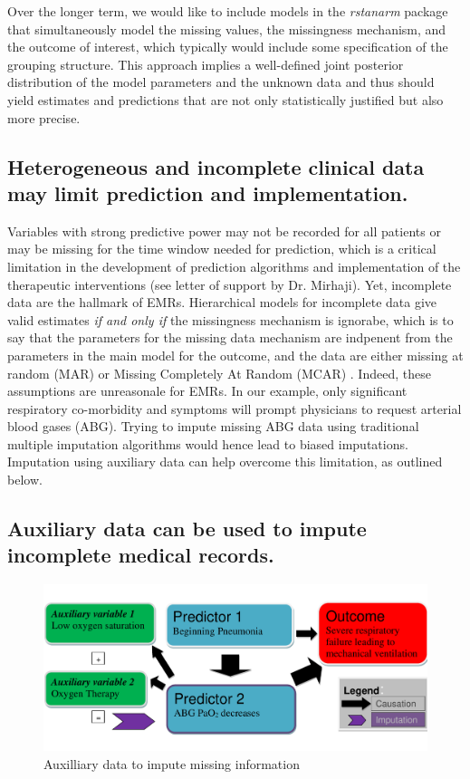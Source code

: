 \documentclass[11pt,notitlepage]{article}
\begin{document}
Over the longer term, we would like to include models in the \textit{rstanarm} package that
simultaneously model the missing values, the missingness mechanism, and the outcome of 
interest, which typically would include some specification of the grouping structure. This
approach implies a well-defined joint posterior distribution of the model parameters and 
the unknown data and thus should yield estimates and predictions that are not only statistically
justified but also more precise.

\subsection*{Heterogeneous and incomplete clinical data may limit prediction and implementation.}
Variables with strong predictive power may not be recorded for all patients 
or may be missing for the time window needed for prediction, which is a critical limitation 
in the development of prediction algorithms and implementation of the 
therapeutic interventions (see letter of support by Dr. Mirhaji). 
Yet, incomplete data are the hallmark of EMRs. 
Hierarchical models for incomplete data give valid estimates 
\textit{if and only if} the missingness mechanism is ignorabe, which is to say that the parameters 
for the missing data mechanism are indpenent from the parameters in the main model for the 
outcome, and the data are either missing at random (MAR) or Missing Completely At Random 
(MCAR) \cite{Rubin1976}. Indeed, these assumptions are unreasonale for EMRs. In our example, only 
significant respiratory co-morbidity and symptoms will prompt physicians to request arterial blood gases (ABG). Trying to 
impute missing ABG data using traditional multiple imputation algorithms would hence lead to biased 
imputations. Imputation using auxiliary data can help overcome this limitation, as outlined below.

\subsection*{Auxiliary data can be used to impute incomplete medical records.} 

\begin{figure} 
 \vspace{-25pt}
 \includegraphics[scale=0.4]{Figures/Bayesian_imputation.pdf}
    \vspace{-20pt}
  \caption{Auxilliary data to impute missing information}
   \vspace{-15pt}
   \label{fig:Imputation_fig}
\end{figure}
\end{document}

